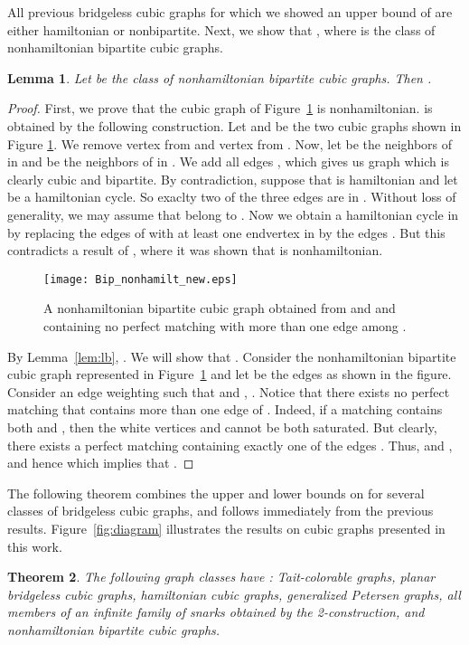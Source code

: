 \documentclass{article}
\newtheorem{thm}{Theorem}
\newtheorem{lem}[thm]{Lemma}
\begin{document}
All previous bridgeless cubic graphs for which we showed an upper bound of  are either hamiltonian or nonbipartite. Next, we show that , where  is the class of nonhamiltonian bipartite cubic graphs.

\begin{lem} \label{lem:bipartiteub}
Let  be the class of nonhamiltonian bipartite cubic graphs. Then .
\end{lem}
\begin{proof}
First, we prove that the cubic graph  of Figure~\ref{fig:spbn} is nonhamiltonian.  is obtained by the following construction. Let  and  be the two cubic graphs shown in Figure \ref{fig:spbn}. We remove vertex  from  and vertex  from . Now, let  be the neighbors of  in  and  be the neighbors of  in . We add all edges , which gives us graph  which is clearly cubic and bipartite. By contradiction, suppose that  is hamiltonian and let  be a hamiltonian cycle. So exaclty two of the three edges  are in . Without loss of generality, we may assume that  belong to . Now we obtain a hamiltonian cycle in  by replacing the edges of  with at least one endvertex in  by the edges . But this contradicts a result of \cite{asano82}, where it was shown that  is nonhamiltonian.

\begin{figure}[ht!]
\centering
\texttt{[image: Bip\_nonhamilt\_new.eps]}
\caption{A nonhamiltonian bipartite cubic graph  obtained from  and  and containing no perfect matching with more than one edge among .}
\label{fig:spbn}
\end{figure}

By Lemma~\ref{lem:lb}, . We will show that . Consider the nonhamiltonian bipartite cubic graph  represented in Figure~\ref{fig:spbn} and let  be the edges as shown in the figure.
Consider an edge weighting  such that  and , . Notice that there exists no perfect matching that contains more than one edge of . Indeed, if a matching contains both  and , then the white vertices  and  cannot be both saturated. But clearly, there exists a perfect matching containing exactly one of the edges . Thus,  and , and hence  which implies that .
\end{proof}

The following theorem combines the upper and lower bounds on  for several classes of bridgeless cubic graphs, and follows immediately from the previous results. Figure~\ref{fig:diagram} illustrates the results on cubic graphs presented in this work.


\begin{thm}
The following graph classes have : Tait-colorable graphs, planar bridgeless cubic graphs, hamiltonian cubic graphs, generalized Petersen graphs, all members of an infinite family of snarks obtained by the 2-construction, and nonhamiltonian bipartite cubic graphs.
\end{thm}
\end{document}
